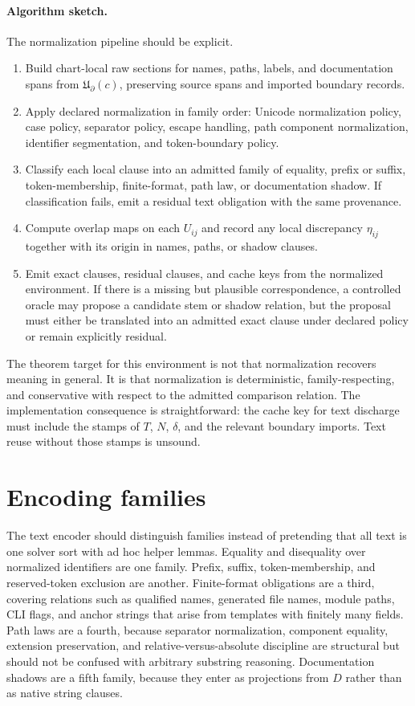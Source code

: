 \documentclass[11pt]{report}
\begin{document}
\paragraph{Algorithm sketch.} The normalization pipeline should be explicit.
\begin{enumerate}
\item Build chart-local raw sections for names, paths, labels, and documentation spans from $\mathfrak{U}_{\partial}(c)$, preserving source spans and imported boundary records.
\item Apply declared normalization in family order: Unicode normalization policy, case policy, separator policy, escape handling, path component normalization, identifier segmentation, and token-boundary policy.
\item Classify each local clause into an admitted family of equality, prefix or suffix, token-membership, finite-format, path law, or documentation shadow. If classification fails, emit a residual text obligation with the same provenance.
\item Compute overlap maps on each $U_{ij}$ and record any local discrepancy $\eta_{ij}$ together with its origin in names, paths, or shadow clauses.
\item Emit exact clauses, residual clauses, and cache keys from the normalized environment. If there is a missing but plausible correspondence, a controlled oracle may propose a candidate stem or shadow relation, but the proposal must either be translated into an admitted exact clause under declared policy or remain explicitly residual.
\end{enumerate}

The theorem target for this environment is not that normalization recovers meaning in general. It is that normalization is deterministic, family-respecting, and conservative with respect to the admitted comparison relation. The implementation consequence is straightforward: the cache key for text discharge must include the stamps of $T$, $N$, $\delta$, and the relevant boundary imports. Text reuse without those stamps is unsound.

\section{Encoding families}
The text encoder should distinguish families instead of pretending that all text is one solver sort with ad hoc helper lemmas. Equality and disequality over normalized identifiers are one family. Prefix, suffix, token-membership, and reserved-token exclusion are another. Finite-format obligations are a third, covering relations such as qualified names, generated file names, module paths, CLI flags, and anchor strings that arise from templates with finitely many fields. Path laws are a fourth, because separator normalization, component equality, extension preservation, and relative-versus-absolute discipline are structural but should not be confused with arbitrary substring reasoning. Documentation shadows are a fifth family, because they enter as projections from $D$ rather than as native string clauses.
\end{document}
